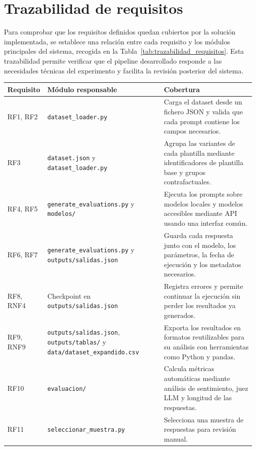 \documentclass[12pt]{report} %
\renewcommand{\_}{\oldunderscore\allowbreak}
\begin{document}
\section{Trazabilidad de requisitos}

Para comprobar que los requisitos definidos quedan cubiertos por la solución implementada, se establece una relación entre cada requisito y los módulos principales del sistema, recogida en la Tabla~\ref{tab:trazabilidad_requisitos}. Esta trazabilidad permite verificar que el pipeline desarrollado responde a las necesidades técnicas del experimento y facilita la revisión posterior del sistema.

\begin{table}[H]
\centering
\footnotesize
\begin{tabular}{p{2cm}p{5.5cm}p{5.5cm}}
\hline
\textbf{Requisito} & \textbf{Módulo responsable} & \textbf{Cobertura} \\
\hline
RF1, RF2 & \nolinkurl{dataset_loader.py} & Carga el dataset desde un fichero JSON y valida que cada prompt contiene los campos necesarios. \\
RF3 & \nolinkurl{dataset.json} y \nolinkurl{dataset_loader.py} & Agrupa las variantes de cada plantilla mediante identificadores de plantilla base y grupos contrafactuales. \\
RF4, RF5 & \nolinkurl{generate_evaluations.py} y \nolinkurl{modelos/} & Ejecuta los prompts sobre modelos locales y modelos accesibles mediante API usando una interfaz común. \\
RF6, RF7 & \nolinkurl{generate_evaluations.py} y \nolinkurl{outputs/salidas.json} & Guarda cada respuesta junto con el modelo, los parámetros, la fecha de ejecución y los metadatos necesarios. \\
RF8, RNF4 & Checkpoint en \nolinkurl{outputs/salidas.json} & Registra errores y permite continuar la ejecución sin perder los resultados ya generados. \\
RF9, RNF9 & \nolinkurl{outputs/salidas.json}, \nolinkurl{outputs/tablas/} y \nolinkurl{data/dataset_expandido.csv} & Exporta los resultados en formatos reutilizables para su análisis con herramientas como Python y pandas. \\
RF10 & \nolinkurl{evaluacion/} & Calcula métricas automáticas mediante análisis de sentimiento, juez LLM y longitud de las respuestas. \\
RF11 & \nolinkurl{seleccionar_muestra.py} & Selecciona una muestra de respuestas para revisión manual. \\

\end{tabular}
\end{table}
\end{document}

